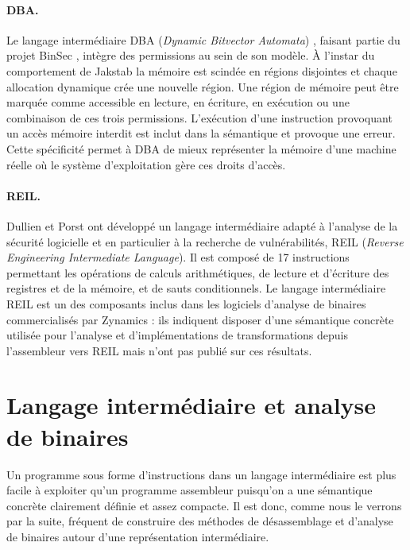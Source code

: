 \paragraph{DBA.}
Le langage intermédiaire DBA (\emph{Dynamic Bitvector Automata}) \cite{bincoa}, faisant partie du projet BinSec \cite{binsec}, intègre des permissions au sein de son modèle. À l'instar du comportement de Jakstab la mémoire est scindée en régions disjointes et chaque allocation dynamique crée une nouvelle région.
Une région de mémoire peut être marquée comme accessible en lecture, en écriture, en exécution ou une combinaison de ces trois permissions.
L'exécution d'une instruction provoquant un accès mémoire interdit est inclut dans la sémantique et provoque une erreur.
Cette spécificité permet à DBA de mieux représenter la mémoire d'une machine réelle où le système d'exploitation gère ces droits d'accès.

\paragraph{REIL.} Dullien et Porst \cite{reil} ont développé un langage intermédiaire adapté à l'analyse de la sécurité logicielle et en particulier à la recherche de vulnérabilités, REIL (\emph{Reverse Engineering Intermediate Language}). Il est composé de 17 instructions permettant les opérations de calculs arithmétiques, de lecture et d'écriture des registres et de la mémoire, et de sauts conditionnels.
Le langage intermédiaire REIL est un des composants inclus dans les logiciels d'analyse de binaires commercialisés par Zynamics \cite{binnavi,bindiff} : ils indiquent disposer d'une sémantique concrète utilisée pour l'analyse et d'implémentations de transformations depuis l'assembleur vers REIL mais n'ont pas publié sur ces résultats.


\section{Langage intermédiaire et analyse de binaires}
Un programme sous forme d'instructions dans un langage intermédiaire est plus facile à exploiter qu'un programme assembleur puisqu'on a une sémantique concrète clairement définie et assez compacte.
Il est donc, comme nous le verrons par la suite, fréquent de construire des méthodes de désassemblage et d'analyse de binaires autour d'une représentation intermédiaire.

